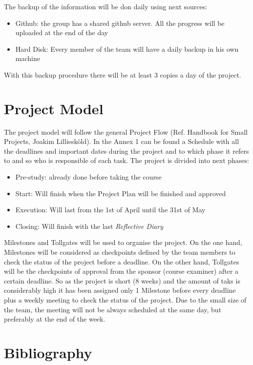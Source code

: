 \documentclass[11pt]{article}
\begin{document}
The backup of the information will be don daily using next sources:

\begin{itemize}
\item Github: the group has a shared github server. All the progress will be uploaded at the end of the day
\item Hard Disk: Every member of the team will have a daily backup in his own machine
\end{itemize}

With this backup procedure there will be at least 3 copies a day of the project.

\section{Project Model}

The project model will follow the general Project Flow (Ref. Handbook for Small Projects, Joakim Lilliesköld). In the Annex 1 can be found a Schedule with all the deadlines and important dates during the project and to which phase it refers to and so who is responsible of each task. The project is divided into next phases:

\begin{itemize}
\item Pre-study: already done before taking the course
\item Start: Will finish when the Project Plan will be finished and approved
\item Execution: Will last from the 1st of April until the 31st of May
\item Closing: Will finish with the last \textit{Reflective Diary}
\end{itemize}

Milestones and Tollgates will be used to organise the project. On the one hand, Milestones will be considered as checkpoints defined by the team members to check the status of the project before a deadline. On the other hand, Tollgates will be the checkpoints of approval from the sponsor (course examiner) after a certain deadline. So as the project is short (8 weeks) and the amount of taks is considerably high it has been assigned only 1 Milestone before every deadline plus a weekly meeting to check the status of the project. Due to the small size of the team, the meeting will not be always scheduled at the same day, but preferably at the end of the week.

\section{Bibliography}
\end{document}
